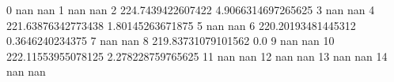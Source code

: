 0 nan nan
1 nan nan
2 224.7439422607422 4.9066314697265625
3 nan nan
4 221.63876342773438 1.80145263671875
5 nan nan
6 220.20193481445312 0.3646240234375
7 nan nan
8 219.83731079101562 0.0
9 nan nan
10 222.11553955078125 2.278228759765625
11 nan nan
12 nan nan
13 nan nan
14 nan nan
